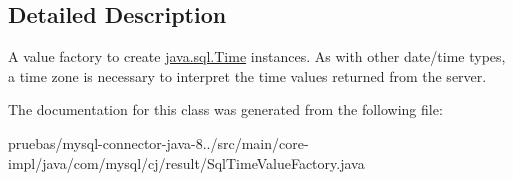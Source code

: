 \subsection{Detailed Description}
A value factory to create \mbox{\hyperlink{}{java.\+sql.\+Time}} instances. As with other date/time types, a time zone is necessary to interpret the time values returned from the server. 

The documentation for this class was generated from the following file\+:\begin{DoxyCompactItemize}
\item 
pruebas/mysql-\/connector-\/java-\/8../src/main/core-\/impl/java/com/mysql/cj/result/Sql\+Time\+Value\+Factory.\+java\end{DoxyCompactItemize}
